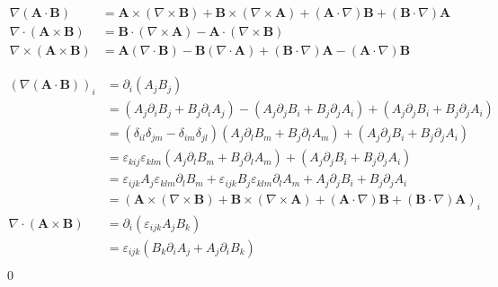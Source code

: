 \documentclass[uplatex,dvipdfmx,a4paper,11pt]{jlreq}
\makeatletter
\newcommand{\grad}{\nabla}
\renewcommand{\div}{\nabla\cdot}
\newcommand{\rot}{\nabla\times}
\theoremstyle{definition}
\renewenvironment{proof}[1][\proofname]{\par
  \normalfont
  \topsep6\p@\@plus6\p@ \trivlist
  \item[\hskip\labelsep{\bfseries #1}\@addpunct{\bfseries}]\ignorespaces\quad\par
}{%
  \qed\endtrivlist\@endpefalse
}
\renewcommand\proofname{証明}
\makeatother
\begin{document}
\begin{theorem}
  \begin{align}
    \grad{(\bm{A}\cdot\bm{B})} & = \bm{A}\times(\rot{\bm{B}}) + \bm{B}\times(\rot{\bm{A}}) + (\bm{A}\cdot\nabla)\bm{B} + (\bm{B}\cdot\nabla)\bm{A} \\
    \div{(\bm{A}\times\bm{B})} & = \bm{B}\cdot(\rot{\bm{A}}) - \bm{A}\cdot(\rot{\bm{B}})                                                           \\
    \rot{(\bm{A}\times\bm{B})} & = \bm{A}(\div{\bm{B}}) - \bm{B}(\div{\bm{A}}) + (\bm{B}\cdot\nabla)\bm{A} - (\bm{A}\cdot\nabla)\bm{B}
  \end{align}
\end{theorem}
\begin{proof}
  \begin{align}
    (\grad{(\bm{A}\cdot\bm{B})})_i & = \partial_i(A_jB_j)                                                                                                                            \\
                                   & = (A_j\partial_iB_j + B_j\partial_iA_j) - (A_j\partial_jB_i + B_j\partial_jA_i) + (A_j\partial_jB_i + B_j\partial_jA_i)                         \\
                                   & = (\delta_{il}\delta_{jm} - \delta_{im}\delta_{jl})(A_j\partial_lB_m + B_j\partial_lA_m) + (A_j\partial_jB_i + B_j\partial_jA_i)                \\
                                   & = \varepsilon_{kij}\varepsilon_{klm}(A_j\partial_lB_m + B_j\partial_lA_m) + (A_j\partial_jB_i + B_j\partial_jA_i)                               \\
                                   & = \varepsilon_{ijk}A_j\varepsilon_{klm}\partial_lB_m + \varepsilon_{ijk}B_j\varepsilon_{klm}\partial_lA_m + A_j\partial_jB_i + B_j\partial_jA_i \\
                                   & = (\bm{A}\times(\rot{\bm{B}}) + \bm{B}\times(\rot{\bm{A}}) + (\bm{A}\cdot\nabla)\bm{B} + (\bm{B}\cdot\nabla)\bm{A})_i                           \\
    \div{(\bm{A}\times\bm{B})}     & = \partial_i(\varepsilon_{ijk}A_jB_k)                                                                                                           \\
                                   & = \varepsilon_{ijk}(B_k\partial_iA_j + A_j\partial_iB_k)                                                                                        \\

\end{align}
\end{proof}
\end{document}
